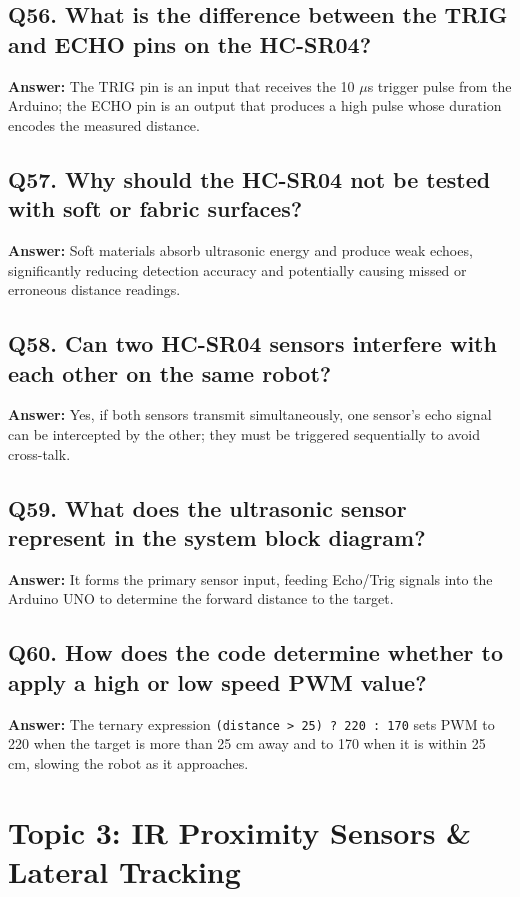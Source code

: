\documentclass[12pt,a4paper,oneside]{report}
\begin{document}
\section{Q56. What is the difference between the TRIG and ECHO pins on the HC-SR04?}
\textbf{Answer:} The TRIG pin is an input that receives the 10 $\mu$s trigger pulse from the Arduino; the ECHO pin is an output that produces a high pulse whose duration encodes the measured distance.

\section{Q57. Why should the HC-SR04 not be tested with soft or fabric surfaces?}
\textbf{Answer:} Soft materials absorb ultrasonic energy and produce weak echoes, significantly reducing detection accuracy and potentially causing missed or erroneous distance readings.

\section{Q58. Can two HC-SR04 sensors interfere with each other on the same robot?}
\textbf{Answer:} Yes, if both sensors transmit simultaneously, one sensor's echo signal can be intercepted by the other; they must be triggered sequentially to avoid cross-talk.

\section{Q59. What does the ultrasonic sensor represent in the system block diagram?}
\textbf{Answer:} It forms the primary sensor input, feeding Echo/Trig signals into the Arduino UNO to determine the forward distance to the target.

\section{Q60. How does the code determine whether to apply a high or low speed PWM value?}
\textbf{Answer:} The ternary expression \texttt{(distance > 25) ? 220 : 170} sets PWM to 220 when the target is more than 25 cm away and to 170 when it is within 25 cm, slowing the robot as it approaches.

\chapter{Topic 3: IR Proximity Sensors \& Lateral Tracking}
\end{document}

